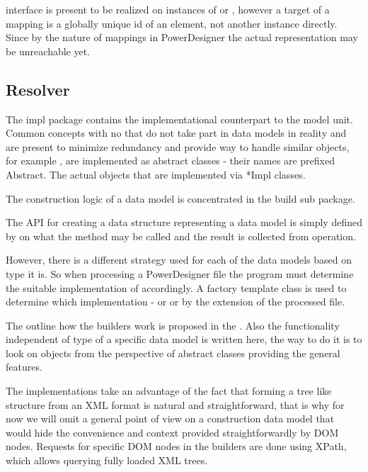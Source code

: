 interface is present to be realized on instances of  or  , however a target of a mapping is a globally unique id of an element, not another instance directly. Since by the nature of mappings in PowerDesigner the actual representation may be unreachable yet.

\subsection{Resolver}

The impl package contains the implementational counterpart to the model unit.
Common concepts with no that do not take part in data models in reality and are present to minimize redundancy and provide way to handle similar objects, for example , are implemented as abstract classes - their names are prefixed Abstract. The actual objects that are implemented via *Impl classes.

The construction logic of a data model is concentrated in the build sub package.

The API for creating a data structure representing a data model is simply defined by  on what the method  may be called and the result is collected from  operation.

However, there is a different strategy used for each of the data models based on type it is. So when processing a PowerDesigner file the program must determine the suitable implementation of  accordingly. 
A factory template class  is used to determine which implementation -  or  or  by the extension of the processed file.

The outline how the builders work is proposed in the . Also the functionality independent of type of a specific data model is written here, the way to do it is to look on objects from the perspective of abstract classes providing the general features.


The implementations take an advantage of the fact that forming a tree like structure from an XML format is natural and straightforward, that is why for now we will omit a general point of view on a construction data model that would hide the convenience and context provided straightforwardly by DOM nodes. 
Requests for specific DOM nodes in the builders are done using XPath, which allows querying fully loaded XML trees.

